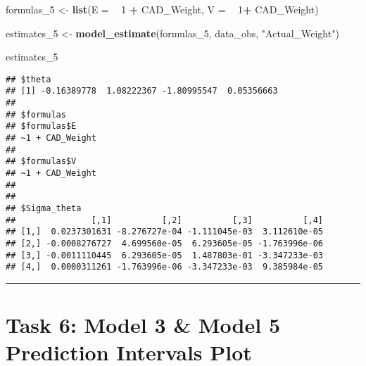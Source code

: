 \documentclass[]{article}
\newenvironment{Shaded}{\begin{snugshade}}{\end{snugshade}}
\newcommand{\KeywordTok}[1]{\textcolor[rgb]{0.13,0.29,0.53}{\textbf{#1}}}
\newcommand{\DataTypeTok}[1]{\textcolor[rgb]{0.13,0.29,0.53}{#1}}
\newcommand{\DecValTok}[1]{\textcolor[rgb]{0.00,0.00,0.81}{#1}}
\newcommand{\StringTok}[1]{\textcolor[rgb]{0.31,0.60,0.02}{#1}}
\newcommand{\OperatorTok}[1]{\textcolor[rgb]{0.81,0.36,0.00}{\textbf{#1}}}
\newcommand{\NormalTok}[1]{#1}
\begin{document}
\begin{Shaded}
\begin{Highlighting}[]
\NormalTok{formulas_}\DecValTok{5}\NormalTok{ <-}\StringTok{ }\KeywordTok{list}\NormalTok{(}\DataTypeTok{E =} \OperatorTok{~}\StringTok{ }\DecValTok{1} \OperatorTok{+}\StringTok{ }\NormalTok{CAD_Weight, }\DataTypeTok{V =} \OperatorTok{~}\StringTok{ }\DecValTok{1}\OperatorTok{+}\StringTok{ }\NormalTok{CAD_Weight)}

\NormalTok{estimates_}\DecValTok{5}\NormalTok{ <-}\StringTok{ }\KeywordTok{model_estimate}\NormalTok{(formulas_}\DecValTok{5}\NormalTok{, data_obs, }\StringTok{"Actual_Weight"}\NormalTok{)}

\NormalTok{estimates_}\DecValTok{5}
\end{Highlighting}
\end{Shaded}

\begin{verbatim}
## $theta
## [1] -0.16389778  1.08222367 -1.80995547  0.05356663
## 
## $formulas
## $formulas$E
## ~1 + CAD_Weight
## 
## $formulas$V
## ~1 + CAD_Weight
## 
## 
## $Sigma_theta
##               [,1]          [,2]          [,3]          [,4]
## [1,]  0.0237301631 -8.276727e-04 -1.111045e-03  3.112610e-05
## [2,] -0.0008276727  4.699560e-05  6.293605e-05 -1.763996e-06
## [3,] -0.0011110445  6.293605e-05  1.487803e-01 -3.347233e-03
## [4,]  0.0000311261 -1.763996e-06 -3.347233e-03  9.385984e-05
\end{verbatim}

\begin{center}\rule{0.5\linewidth}{\linethickness}\end{center}

\section{Task 6: Model 3 \& Model 5 Prediction Intervals
Plot}\label{task-6-model-3-model-5-prediction-intervals-plot}
\end{document}
